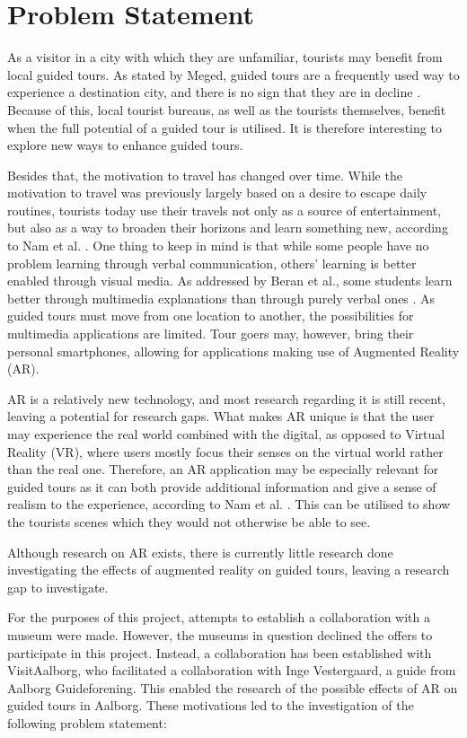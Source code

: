\chapter{Problem Statement}\label{ch:problemstatement}
As a visitor in a city with which they are unfamiliar, tourists may benefit from local guided tours. As stated by Meged, guided tours are a frequently used way to experience a destination city, and there is no sign that they are in decline \cite{Meged2010}. Because of this, local tourist bureaus, as well as the tourists themselves, benefit when the full potential of a guided tour is utilised. It is therefore interesting to explore new ways to enhance guided tours. 

Besides that, the motivation to travel has changed over time. While the motivation to travel was previously largely based on a desire to escape daily routines, tourists today use their travels not only as a source of entertainment, but also as a way to broaden their horizons and learn something new, according to Nam et al. \cite{Nam2006}. One thing to keep in mind is that while some people have no problem learning through verbal communication, others' learning is better enabled through visual media. As addressed by Beran et al., some students learn better through multimedia explanations than through purely verbal ones \cite{Beran2012}. As guided tours must move from one location to another, the possibilities for multimedia applications are limited. Tour goers may, however, bring their personal smartphones, allowing for applications making use of Augmented Reality (AR).

AR is a relatively new technology, and most research regarding it is still recent, leaving a potential for research gaps. What makes AR unique is that the user may experience the real world combined with the digital, as opposed to Virtual Reality (VR), where users mostly focus their senses on the virtual world rather than the real one. Therefore, an AR application may be especially relevant for guided tours as it can both provide additional information and give a sense of realism to the experience, according to Nam et al. \cite{Nam2006}. This can be utilised to show the tourists scenes which they would not otherwise be able to see.

Although research on AR exists, there is currently little research done investigating the effects of augmented reality on guided tours, leaving a research gap to investigate.

For the purposes of this project, attempts to establish a collaboration with a museum were made. However, the museums in question declined the offers to participate in this project. Instead, a collaboration has been established with VisitAalborg, who facilitated a collaboration with Inge Vestergaard, a guide from Aalborg Guideforening. This enabled the research of the possible effects of AR on guided tours in Aalborg. These motivations led to the investigation of the following problem statement:

